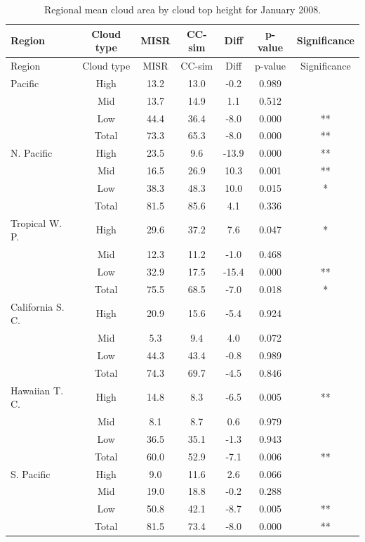 \begin{longtable}[]{@{}lcccccc@{}}
\caption{\label{tbl:misr_cldmisr_table_january}Regional mean cloud area
by cloud top height for January 2008. }\tabularnewline
\toprule
Region & Cloud type & MISR & CC-sim & Diff & p-value &
Significance\tabularnewline
\midrule
\endfirsthead
\toprule
Region & Cloud type & MISR & CC-sim & Diff & p-value &
Significance\tabularnewline
\midrule
\endhead
Pacific & High & 13.2 & 13.0 & -0.2 & 0.989 &\tabularnewline
& Mid & 13.7 & 14.9 & 1.1 & 0.512 &\tabularnewline
& Low & 44.4 & 36.4 & -8.0 & 0.000 & **\tabularnewline
& Total & 73.3 & 65.3 & -8.0 & 0.000 & **\tabularnewline
N. Pacific & High & 23.5 & 9.6 & -13.9 & 0.000 & **\tabularnewline
& Mid & 16.5 & 26.9 & 10.3 & 0.001 & **\tabularnewline
& Low & 38.3 & 48.3 & 10.0 & 0.015 & *\tabularnewline
& Total & 81.5 & 85.6 & 4.1 & 0.336 &\tabularnewline
Tropical W. P. & High & 29.6 & 37.2 & 7.6 & 0.047 & *\tabularnewline
& Mid & 12.3 & 11.2 & -1.0 & 0.468 &\tabularnewline
& Low & 32.9 & 17.5 & -15.4 & 0.000 & **\tabularnewline
& Total & 75.5 & 68.5 & -7.0 & 0.018 & *\tabularnewline
California S. C. & High & 20.9 & 15.6 & -5.4 & 0.924 &\tabularnewline
& Mid & 5.3 & 9.4 & 4.0 & 0.072 &\tabularnewline
& Low & 44.3 & 43.4 & -0.8 & 0.989 &\tabularnewline
& Total & 74.3 & 69.7 & -4.5 & 0.846 &\tabularnewline
Hawaiian T. C. & High & 14.8 & 8.3 & -6.5 & 0.005 & **\tabularnewline
& Mid & 8.1 & 8.7 & 0.6 & 0.979 &\tabularnewline
& Low & 36.5 & 35.1 & -1.3 & 0.943 &\tabularnewline
& Total & 60.0 & 52.9 & -7.1 & 0.006 & **\tabularnewline
S. Pacific & High & 9.0 & 11.6 & 2.6 & 0.066 &\tabularnewline
& Mid & 19.0 & 18.8 & -0.2 & 0.288 &\tabularnewline
& Low & 50.8 & 42.1 & -8.7 & 0.005 & **\tabularnewline
& Total & 81.5 & 73.4 & -8.0 & 0.000 & **\tabularnewline
\bottomrule
\end{longtable}

